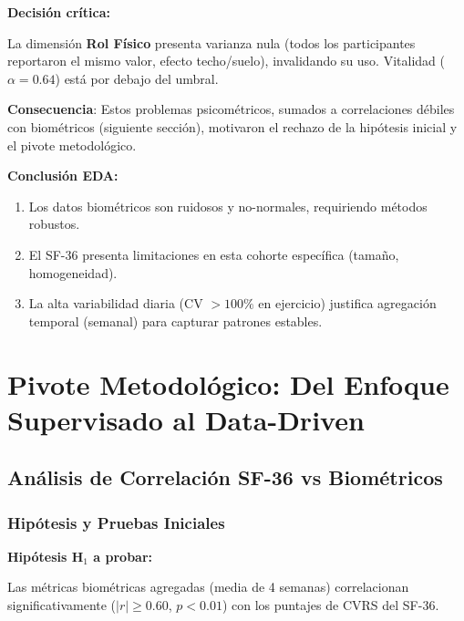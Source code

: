 \documentclass[12pt,letterpaper,twoside]{report}
\begin{document}
\begin{decisionbox}
\textbf{Decisión crítica:}

La dimensión \textbf{Rol Físico} presenta varianza nula (todos los participantes reportaron el mismo valor, efecto techo/suelo), invalidando su uso. Vitalidad ($\alpha=0.64$) está por debajo del umbral.

\textbf{Consecuencia}: Estos problemas psicométricos, sumados a correlaciones débiles con biométricos (siguiente sección), motivaron el rechazo de la hipótesis inicial y el pivote metodológico.
\end{decisionbox}

\begin{conclusionbox}
\textbf{Conclusión EDA:}

\begin{enumerate}[noitemsep]
    \item Los datos biométricos son ruidosos y no-normales, requiriendo métodos robustos.
    \item El SF-36 presenta limitaciones en esta cohorte específica (tamaño, homogeneidad).
    \item La alta variabilidad diaria (CV $> 100\%$ en ejercicio) justifica agregación temporal (semanal) para capturar patrones estables.
\end{enumerate}
\end{conclusionbox}

\chapter{Pivote Metodológico: Del Enfoque Supervisado al Data-Driven}

\section{Análisis de Correlación SF-36 vs Biométricos}

\subsection{Hipótesis y Pruebas Iniciales}

\begin{hipotesisbox}
\textbf{Hipótesis H$_1$ a probar:}

Las métricas biométricas agregadas (media de 4 semanas) correlacionan significativamente ($|r| \geq 0.60$, $p<0.01$) con los puntajes de CVRS del SF-36.
\end{hipotesisbox}
\end{document}
